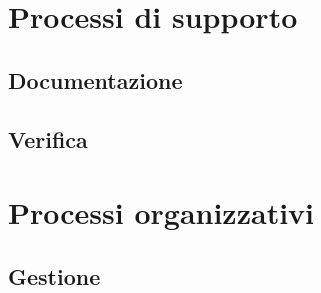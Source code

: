 \documentclass[a4paper,titlepage]{article}
\begin{document}
  
\section{Processi di supporto}
 \subsection{Documentazione}

 
 \subsection{Verifica}
  
\newpage
\section{Processi organizzativi}
 \subsection{Gestione}
  
\end{document}
